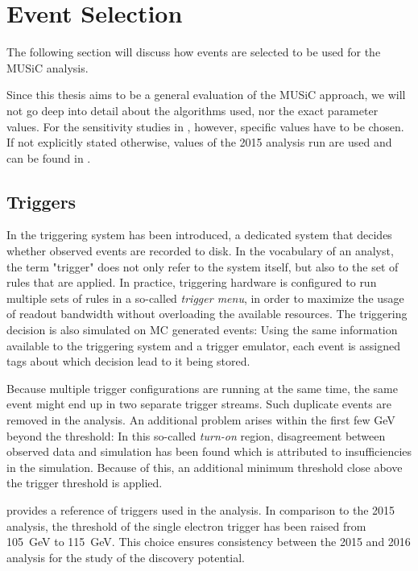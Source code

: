 \section{Event Selection}
\label{sec:event_selection}

The following section will discuss how events are selected to be used for the \ac{MUSiC} analysis. 

Since this thesis aims to be a general evaluation of the \ac{MUSiC} approach, we will not go deep into detail about the algorithms used, nor the exact parameter values. For the sensitivity studies in , however, specific values have to be chosen. If not explicitly stated otherwise, values of the 2015 analysis run are used and can be found in \cite{Roemer:ModelUnspecificSearch}.

\subsection{Triggers}
\newcommand{\trigger}[1]{\texttt{\detokenize{#1}}}
In  the triggering system has been introduced, a dedicated system that decides whether observed events are recorded to disk. In the vocabulary of an analyst, the term "trigger" does not only refer to the system itself, but also to the set of rules that are applied. In practice, triggering hardware is configured to run multiple sets of rules in a so-called \emph{trigger menu}, in order to maximize the usage of readout bandwidth without overloading the available resources.
The triggering decision is also simulated on \ac{MC} generated events: Using the same information available to the triggering system and a trigger emulator, each event is assigned tags about which decision lead to it being stored. 

Because multiple trigger configurations are running at the same time, the same event might end up in two separate trigger streams. Such duplicate events are removed in the analysis.
An additional problem arises within the first few \si{\GeV} beyond the \pT threshold: In this so-called \emph{turn-on} region, disagreement between observed data and simulation has been found which is attributed to insufficiencies in the simulation. Because of this, an additional minimum \pT threshold close above the trigger threshold is applied.

 provides a reference of triggers used in the analysis. In comparison to the 2015 analysis, the \pT threshold of the single electron trigger has been raised from \SI{105}{\GeV} to \SI{115}{\GeV}. This choice ensures consistency between the 2015 and 2016 analysis for the study of the discovery potential.

